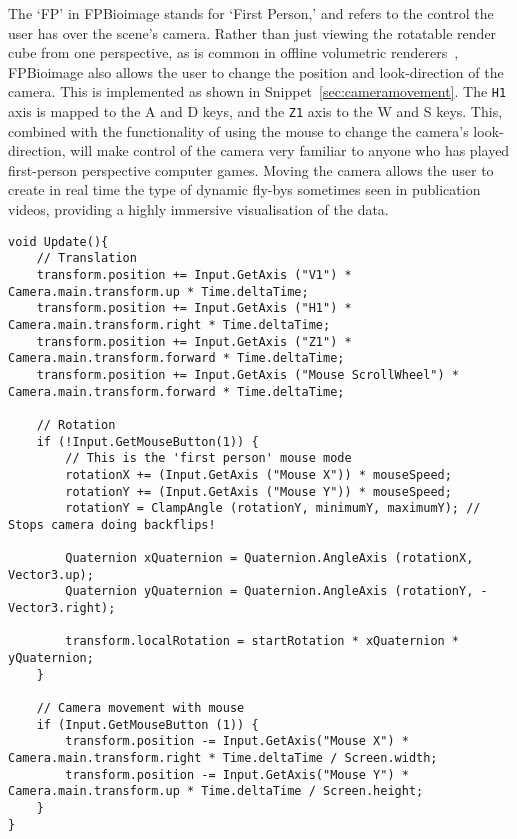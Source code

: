 The `FP' in FPBioimage stands for `First Person,' and refers to the control the user has over the scene's camera.
Rather than just viewing the rotatable render cube from one perspective, as is common in offline volumetric renderers~\cite{schindelin2012fiji, de2012icy, imaris}, FPBioimage also allows the user to change the position and look-direction of the camera.
This is implemented as shown in Snippet~\ref{sec:cameramovement}.
The \texttt{H1} axis is mapped to the A and D keys, and the \texttt{Z1} axis to the W and S keys.
This, combined with the functionality of using the mouse to change the camera's look-direction, will make control of the camera very familiar to anyone who has played first-person perspective computer games.
Moving the camera allows the user to create in real time the type of dynamic fly-bys sometimes seen in publication videos, providing a highly immersive visualisation of the data.

\begin{lstfloat}
\begin{lstlisting}[language={[Sharp]c}, label={sec:cameramovement}, caption={C\# code using built-in Unity functions for moving the camera in a first-person manner}]
void Update(){
	// Translation
	transform.position += Input.GetAxis ("V1") * Camera.main.transform.up * Time.deltaTime;
	transform.position += Input.GetAxis ("H1") * Camera.main.transform.right * Time.deltaTime;
	transform.position += Input.GetAxis ("Z1") * Camera.main.transform.forward * Time.deltaTime;
	transform.position += Input.GetAxis ("Mouse ScrollWheel") * Camera.main.transform.forward * Time.deltaTime;

	// Rotation
	if (!Input.GetMouseButton(1)) {
		// This is the 'first person' mouse mode
		rotationX += (Input.GetAxis ("Mouse X")) * mouseSpeed;
		rotationY += (Input.GetAxis ("Mouse Y")) * mouseSpeed;
		rotationY = ClampAngle (rotationY, minimumY, maximumY); // Stops camera doing backflips!

		Quaternion xQuaternion = Quaternion.AngleAxis (rotationX, Vector3.up);
		Quaternion yQuaternion = Quaternion.AngleAxis (rotationY, -Vector3.right);

		transform.localRotation = startRotation * xQuaternion * yQuaternion;
	}

	// Camera movement with mouse
	if (Input.GetMouseButton (1)) {
		transform.position -= Input.GetAxis("Mouse X") * Camera.main.transform.right * Time.deltaTime / Screen.width;
		transform.position -= Input.GetAxis("Mouse Y") * Camera.main.transform.up * Time.deltaTime / Screen.height;
	}
}
\end{lstlisting}
\end{lstfloat}


